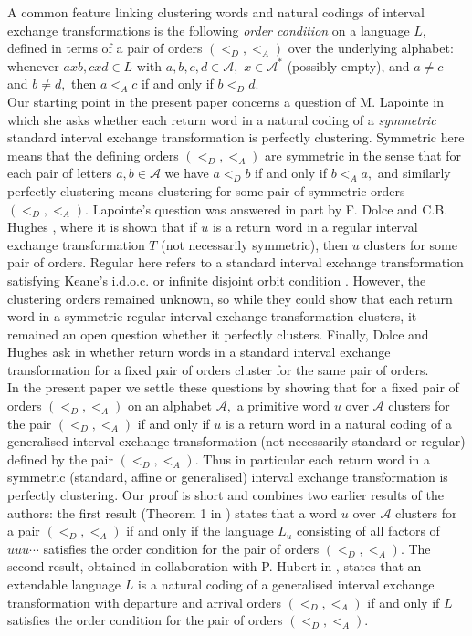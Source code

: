 \documentclass[12pt,a4paper]{amsart}
\begin{document}
A common feature linking clustering words  and natural codings of interval exchange transformations is the following  {\it order condition} on a language $L$,  defined in terms of a pair of orders  $(<_D, <_A)$ over the underlying alphabet: whenever $axb, cxd \in L$ with $a, b,c,d \in \mathcal A,$  $x\in \mathcal A^*$ (possibly empty), and $a\neq c$ and $b\neq d,$ then $a<_A c$ if and only if $b<_D d.$ \\   

Our starting point in the present paper concerns  a question of M. Lapointe \cite{lap} in which she asks whether each return word in a natural coding of a {\it symmetric} standard interval exchange transformation is perfectly clustering. Symmetric here means that  the defining orders $(<_D, <_A)$ are symmetric in the sense that for each pair of letters $a,b\in \mathcal A$ we have $a<_D b$ if and only if $b<_A a,$ and similarly perfectly clustering means clustering for some  pair  of symmetric orders $(<_D, <_A).$ Lapointe's question was answered in part by F. Dolce and C.B. Hughes \cite{d}, where it is shown that if $u$ is a return word in a regular interval exchange transformation $T$ (not necessarily symmetric), then $u$ clusters for some pair of orders. Regular here refers to a standard interval exchange transformation satisfying Keane's i.d.o.c. or infinite disjoint orbit condition \cite{kea}.  However, the clustering orders remained unknown, so while they could show that each return word in a symmetric regular interval exchange transformation clusters, it remained an open question whether it perfectly clusters.  Finally, Dolce and Hughes ask in \cite{d}  whether return words in a standard interval exchange transformation for a fixed pair of orders cluster for the same pair of orders.  \\

In the present paper we settle these questions by showing that for a fixed pair of orders $(<_D, <_A)$ on an alphabet $\mathcal A,$ a primitive word $u$ over $\mathcal A$ clusters for the pair $(<_D,<_A)$ if and only if $u$ is a return word in a natural coding of a generalised interval exchange transformation (not necessarily standard or regular) defined by the pair $(<_D,<_A).$  Thus in particular each return word in a symmetric (standard, affine or generalised) interval exchange transformation is perfectly clustering. Our proof is short and combines two earlier results of the authors: the first result (Theorem 1 in  \cite{fz5})  states that a word $u$ over $\mathcal A$ clusters for a pair $(<_D, <_A)$ if and only if the language $L_u$ consisting of all factors of $uuu \cdots$ satisfies the order condition for the pair of orders $(<_D,<_A).$ The second result, obtained in collaboration with P. Hubert  in \cite{fhuz}, states that an extendable language  $L$ is a natural coding of a  generalised interval exchange transformation with departure and arrival orders  $(<_D,<_A)$ if and only if $L$ satisfies the order condition for the pair of orders $(<_D,<_A).$ 
 
\end{document}
